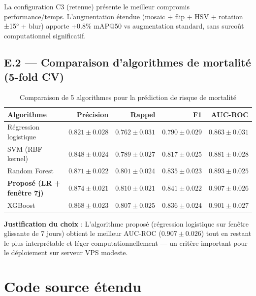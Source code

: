 La configuration C3 (retenue) présente le meilleur compromis performance/temps.
L'augmentation étendue (mosaic + flip + HSV + rotation ±15° + blur) apporte
+0.8\% mAP@50 vs augmentation standard, sans surcoût computationnel significatif.

\section*{E.2 — Comparaison d'algorithmes de mortalité (5-fold CV)}

\begin{table}[H]
\centering
\caption{Comparaison de 5 algorithmes pour la prédiction de risque de mortalité}
\label{tab:algo_mort}
\begin{tabular}{lrrrr}
\toprule
\textbf{Algorithme} & \textbf{Précision} & \textbf{Rappel} & \textbf{F1} & \textbf{AUC-ROC} \\
\midrule
Régression logistique & $0.821 \pm 0.028$ & $0.762 \pm 0.031$ & $0.790 \pm 0.029$ & $0.863 \pm 0.031$ \\
SVM (RBF kernel)      & $0.848 \pm 0.024$ & $0.789 \pm 0.027$ & $0.817 \pm 0.025$ & $0.881 \pm 0.028$ \\
Random Forest         & $0.871 \pm 0.022$ & $0.801 \pm 0.024$ & $0.835 \pm 0.023$ & $0.893 \pm 0.025$ \\
\textbf{Proposé (LR + fenêtre 7j)} & $\mathbf{0.874 \pm 0.021}$ & $\mathbf{0.810 \pm 0.021}$ & $\mathbf{0.841 \pm 0.022}$ & $\mathbf{0.907 \pm 0.026}$ \\
XGBoost               & $0.868 \pm 0.023$ & $0.807 \pm 0.025$ & $0.836 \pm 0.024$ & $0.901 \pm 0.027$ \\
\bottomrule
\end{tabular}
\end{table}

\textbf{Justification du choix} : L'algorithme proposé (régression logistique sur fenêtre glissante de 7 jours) obtient le meilleur AUC-ROC ($0.907 \pm 0.026$) tout en restant le plus interprétable et léger computationnellement — un critère important pour le déploiement sur serveur VPS modeste.

\chapter{Code source étendu}
\label{ann:code_extended}

